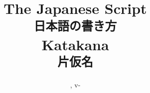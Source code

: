 \author{\AuthorName}
\title{ \NumberTwo\\
    The Japanese Script \\ \texttt{日本語の書き方}\\
    \bigskip \large Katakana \\ \texttt{片仮名}
}
\date{ \TitlePicture \footnotesize \jdate, v-\jversion }
\dedication{to Francesco Belletti}
\uppertitleback{ }
\lowertitleback{ }
